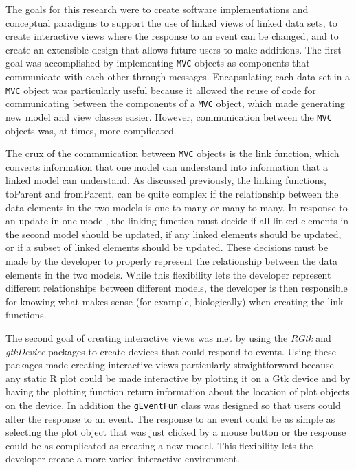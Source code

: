\documentclass[11pt]{article}
\newcommand{\Rfunction}[1]{{\textsf{#1}}}
\newcommand{\Robject}[1]{{\texttt{#1}}}
\newcommand{\Rpackage}[1]{{\textit{#1}}}
\newcommand{\Rclass}[1]{\texttt{#1}}
\begin{document}
The goals for this research were to create software implementations and conceptual paradigms to support the use of linked views of linked data sets, to
create interactive views where the response to an event can be changed, and to
create an extensible design that allows future users to make additions.
The first goal was accomplished by implementing \Robject{MVC} objects as
components that communicate with each other through messages.  Encapsulating
each data set in a \Robject{MVC} object was particularly useful because it
allowed the reuse of code for communicating between the components of a
\Robject{MVC} object, which made generating new model and view classes easier.
However, communication between the \Robject{MVC} objects was, at times, more
complicated. 

The crux of the communication between \Robject{MVC} objects is the link
function, which converts information that one model can understand into
information that a linked model can understand.  As discussed previously, the
linking functions, \Rfunction{toParent} and \Rfunction{fromParent}, can be
quite complex if the relationship between the data elements in the two models
is one-to-many or many-to-many.  In response to an update in one model, the
linking function must decide if all linked elements in the second model
should be updated, if any linked elements should be updated, or if a subset of
linked elements should be updated.  These decisions must be made by the
developer to properly represent the relationship between the data elements in
the two models.  While this flexibility lets the developer represent different
relationships between different models, the developer is then responsible for
knowing what makes sense (for example, biologically) when creating the link
functions. 

The second goal of creating interactive views was met by using the
\Rpackage{RGtk} and \Rpackage{gtkDevice} packages to create devices that could
respond to events.  Using these packages made creating interactive views
particularly straightforward because any static R plot could be made
interactive by plotting it on a Gtk device and by having the plotting function
return information about the location of plot objects on the device.  In
addition the \Rclass{gEventFun} class was designed so that users could alter
the response to an event.  The response to an event could be as simple as
selecting the plot object that was just clicked by a mouse button or the
response could be as complicated as creating a new model.  This flexibility
lets the developer create a more varied interactive environment.
\end{document}
